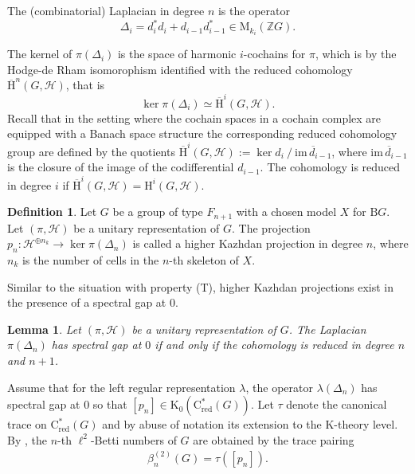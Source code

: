 \documentclass[a4paper,leqno,12pt]{article}
\numberwithin{equation}{section}
\theoremstyle{plain}
\newtheorem{lemma}[theoremcounter]{Lemma}
\theoremstyle{definition}
\newtheorem{definition}[theoremcounter]{Definition}
\theoremstyle{remark}
\newcommand{\Cs}{\mathrm{C}^*}
\newcommand{\Csr}{\mathrm{C}^*_{\text{red}}}
\newcommand{\ra}{\rightarrow}
\begin{document}
	The (combinatorial) Laplacian in degree $n$ is the operator
	\[
	\Delta_i = d_i^* d_i + d_{i-1} d^*_{i-1} \in \mathrm M_{k_{i}}(\mathbb {Z}G).
	\]
	
	The kernel of $\pi(\Delta_i)$ is the space of harmonic $i$-cochains for $\pi$, which is by the Hodge-de Rham isomorophism identified with the reduced cohomology ${\overline{\mathrm H}}^n(G, \mathcal H)$, that is
	\[
	\ker \pi(\Delta_i) \simeq {\overline{\mathrm H}}^i(G, \mathcal H). 
	\]
	Recall that in the setting where the cochain spaces in a cochain complex are equipped with a Banach space structure the corresponding reduced cohomology group are defined by the quotients 
	${\overline{\mathrm H}}^i(G, \mathcal H) :=\ker d_i ~/~ \overline{\mathrm{im} \, d_{i-1}}$, where $\overline{\mathrm{im}\,d_{i-1}}$ is the closure of the image of the codifferential $d_{i-1}$. The cohomology is reduced in degree $i$ if 
	${\overline{\mathrm H}}^i(G, \mathcal H) = \mathrm {H}^i(G, \mathcal H)$.
	
	\begin{definition} \cite{linowakpooya2020}
		Let $G$ be a group of type $F_{n+1}$ with a chosen model $X$ for $\mathrm B G$. Let $(\pi, \mathcal H)$ be a unitary representation of $G$. The projection $p_n \colon \mathcal H ^{\oplus n_k} \ra \ker \pi(\Delta_{n})$ is called a higher Kazhdan projection in degree $n$, where $n_k$ is the number of cells in the $n$-th skeleton of $X$.	
	\end{definition}
	
	Similar to the situation with property (T), higher Kazhdan projections exist in the presence of a spectral gap at $0$.
	
	\begin{lemma} 
		{\cite [Proposition 16.2] {badernowak2020}} 
		\label{lem:spectral gap condition}
		Let $(\pi, \mathcal H)$ be a unitary representation of $G$. The Laplacian $\pi(\Delta_n)$ has spectral gap at $0$ if and only if the cohomology is reduced in degree $n$ and $n+1$.
	\end{lemma}
	
	Assume that for the left regular representation $\lambda$, the operator $\lambda(\Delta_n)$ has spectral gap at $0$ so that $[p_n] \in \mathrm K_0 (\Csr(G))$. Let $\tau$ denote the canonical trace on $\Csr(G)$ and by abuse of notation its extension to the K-theory level. By \cite[Proposition 7]{linowakpooya2020}, the $n$-th $\ell^2$-Betti numbers of $G$ are obtained by the trace pairing  
	\begin{gather} \label{def:l2 betti number definition}
		\beta^{(2)}_n (G) = \tau ([p_n]).
	\end{gather}
	
\end{document}
